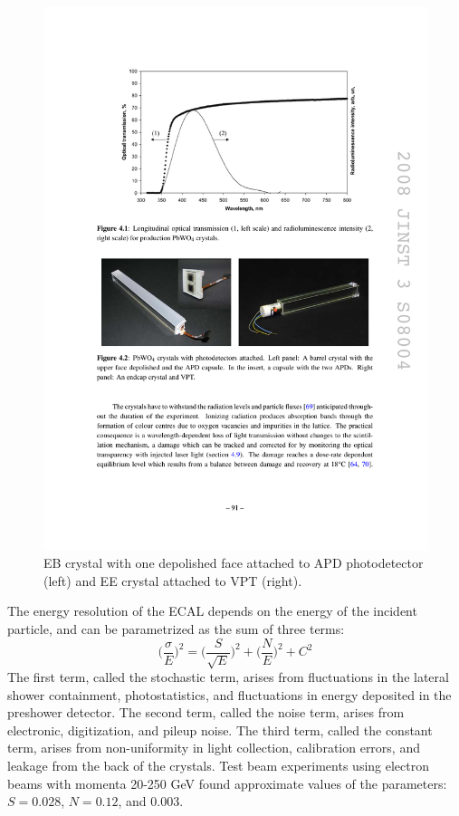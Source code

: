 \begin{figure}[tbh]
\centering
\includegraphics[width=6in]{figures/crystalmodules.pdf}
\caption{EB crystal with one depolished face attached to APD photodetector (left) and EE crystal attached to VPT (right).}
\label{fig:crystalmodules}
\end{figure}

\indent The energy resolution of the ECAL depends on the energy of the incident particle, and can be parametrized as the sum of three terms:
\begin{equation}
\bigg(\frac{\sigma}{E}\bigg)^2 = \bigg(\frac{S}{\sqrt{E}}\bigg)^2 + \bigg(\frac{N}{E}\bigg)^2 + C^2
\end{equation}
The first term, called the stochastic term, arises from fluctuations in the lateral shower containment, photostatistics, and fluctuations in energy deposited in the preshower detector. The second term, called the noise term, arises from electronic, digitization, and pileup noise. The third term, called the constant term, arises from non-uniformity in light collection, calibration errors, and leakage from the back of the crystals. Test beam experiments using electron beams with momenta 20-250 GeV found approximate values of the parameters: $S=0.028$, $N=0.12$, and $0.003$. 

